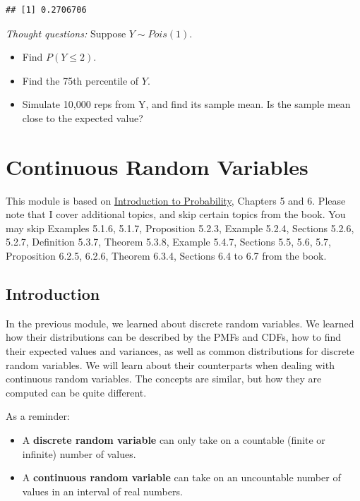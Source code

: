 \documentclass[
]{book}
\providecommand{\tightlist}{%
  \setlength{\itemsep}{0pt}\setlength{\parskip}{0pt}}
\begin{document}
\begin{verbatim}
## [1] 0.2706706
\end{verbatim}

\emph{Thought questions:} Suppose \(Y \sim Pois(1)\).

\begin{itemize}
\tightlist
\item
  Find \(P(Y \leq 2)\).
\item
  Find the 75th percentile of \(Y\).
\item
  Simulate 10,000 reps from Y, and find its sample mean. Is the sample mean close to the expected value?
\end{itemize}

\hypertarget{continuous-random-variables}{%
\chapter{Continuous Random Variables}\label{continuous-random-variables}}

This module is based on \href{https://stat110.hsites.harvard.edu/}{Introduction to Probability}, Chapters 5 and 6. Please note that I cover additional topics, and skip certain topics from the book. You may skip Examples 5.1.6, 5.1.7, Proposition 5.2.3, Example 5.2.4, Sections 5.2.6, 5.2.7, Definition 5.3.7, Theorem 5.3.8, Example 5.4.7, Sections 5.5, 5.6, 5.7, Proposition 6.2.5, 6.2.6, Theorem 6.3.4, Sections 6.4 to 6.7 from the book.

\hypertarget{introduction}{%
\section{Introduction}\label{introduction}}

In the previous module, we learned about discrete random variables. We learned how their distributions can be described by the PMFs and CDFs, how to find their expected values and variances, as well as common distributions for discrete random variables. We will learn about their counterparts when dealing with continuous random variables. The concepts are similar, but how they are computed can be quite different.

As a reminder:

\begin{itemize}
\tightlist
\item
  A \textbf{discrete random variable} can only take on a countable (finite or infinite) number of values.
\item
  A \textbf{continuous random variable} can take on an uncountable number of values in an interval of real numbers.
\end{itemize}
\end{document}
